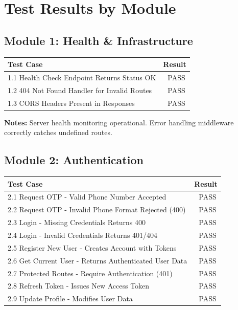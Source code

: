 \documentclass[11pt,a4paper]{article}
\newcommand{\pass}{\textcolor{pass}{\checkmark\ PASS}}
\begin{document}
\section{Test Results by Module}

\subsection{Module 1: Health \& Infrastructure}

\begin{tabular}{|p{10cm}|c|}
\hline
\textbf{Test Case} & \textbf{Result} \\
\hline
1.1 Health Check Endpoint Returns Status OK & \pass \\
\hline
1.2 404 Not Found Handler for Invalid Routes & \pass \\
\hline
1.3 CORS Headers Present in Responses & \pass \\
\hline
\end{tabular}

\vspace{0.5cm}
\textbf{Notes:} Server health monitoring operational. Error handling middleware correctly catches undefined routes.

\subsection{Module 2: Authentication}

\begin{tabular}{|p{10cm}|c|}
\hline
\textbf{Test Case} & \textbf{Result} \\
\hline
2.1 Request OTP - Valid Phone Number Accepted & \pass \\
\hline
2.2 Request OTP - Invalid Phone Format Rejected (400) & \pass \\
\hline
2.3 Login - Missing Credentials Returns 400 & \pass \\
\hline
2.4 Login - Invalid Credentials Returns 401/404 & \pass \\
\hline
2.5 Register New User - Creates Account with Tokens & \pass \\
\hline
2.6 Get Current User - Returns Authenticated User Data & \pass \\
\hline
2.7 Protected Routes - Require Authentication (401) & \pass \\
\hline
2.8 Refresh Token - Issues New Access Token & \pass \\
\hline
2.9 Update Profile - Modifies User Data & \pass \\
\hline
\end{tabular}
\end{document}
